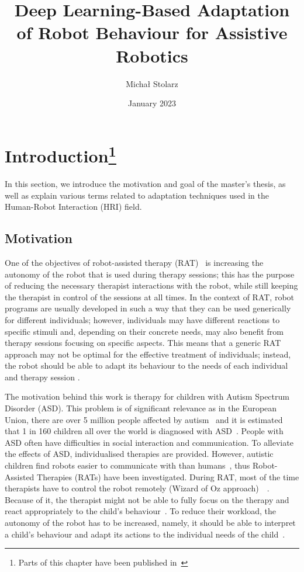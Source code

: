 \documentclass[thesis]{mas_proposal}
\title{Deep Learning-Based Adaptation of Robot Behaviour for Assistive Robotics}
\author{Michał Stolarz}
\date{January 2023}
\begin{document}
\maketitle

\pagestyle{plain}

\section[Introduction]{Introduction\footnote{Parts of this chapter have been published in~\cite{stolarz2022personalized,stolarz2022learningbased}}}
In this section, we introduce the motivation and goal of the master's thesis, as well as explain various terms related to adaptation techniques used in the Human-Robot Interaction (HRI) field.
\subsection{Motivation}
One of the objectives of robot-assisted therapy (RAT)~\cite{esteban2017build} is increasing the autonomy of the robot that is used during therapy sessions; this has the purpose of reducing the necessary therapist interactions with the robot, while still keeping the therapist in control of the sessions at all times.
In the context of RAT, robot programs are usually developed in such a way that they can be used generically for different individuals; however, individuals may have different reactions to specific stimuli and, depending on their concrete needs, may also benefit from therapy sessions focusing on specific aspects.
This means that a generic RAT approach may not be optimal for the effective treatment of individuals; instead, the robot should be able to adapt its behaviour to the needs of each individual and therapy session \cite{esteban2017build,scassellati2018improving,rudovic2018personalized}.

The motivation behind this work is therapy for children with Autism Spectrum Disorder (ASD). 
This problem is of significant relevance as in the European Union, there are over 5 million people affected by autism~\cite{deenigma2022} and it is estimated that 1 in 160 children all over the world is diagnosed with ASD~\cite{jain2020modeling}. 
People with ASD often have difficulties in social interaction and communication. 
To alleviate the effects of ASD, individualised therapies are provided. 
However, autistic children find robots easier to communicate with than humans~\cite{robins2006}, thus Robot-Assisted Therapies (RATs) have been investigated. During RAT, most of the time therapists have to control the robot remotely (Wizard of Oz approach)~\cite{deenigma2022}~\cite{david2018developing,robins2017developing,rudovic2017measuring,marinoiu20183d}. 
Because of it, the therapist might not be able to fully focus on the therapy and react appropriately to the child's behaviour~\cite{cao2018personalized}. 
To reduce their workload, the autonomy of the robot has to be increased, namely, it should be able to interpret a child’s behaviour and adapt its actions to the individual needs of the child~\cite{esteban2017build}.
\end{document}
